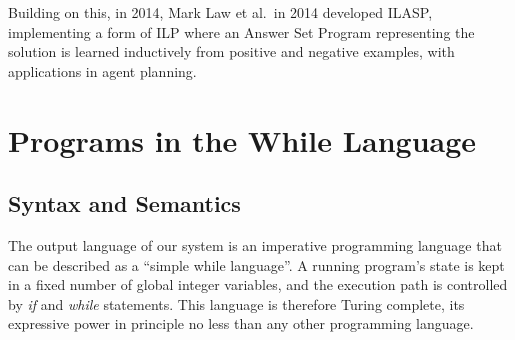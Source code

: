 \documentclass[a4paper,twoside,notitlepage]{report}
\begin{document}
Building on this, in 2014, Mark Law et al.\ in 2014 developed
ILASP\cite{ilasp}, implementing a form of ILP where an Answer Set Program
representing the solution is learned inductively from positive and negative
examples, with applications in agent planning.

\chapter{Programs in the While Language} \label{chp:whilan}

\section{Syntax and Semantics}

The output language of our system is an imperative programming language that 
can be described as a ``simple while language''. A running program's state is 
kept in a fixed number of global integer variables, and the execution path is 
controlled by \emph{if} and \emph{while} statements. This language is 
therefore Turing complete, its expressive power in principle no less than any 
other programming language.
\end{document}
